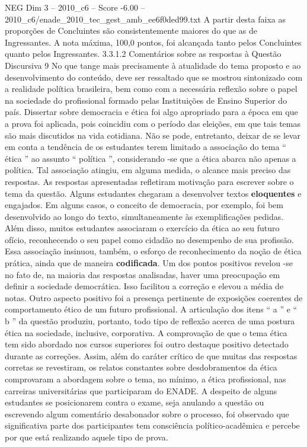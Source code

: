 \begin{textsample}{NEG Dim 3 – 2010\_c6 – Score -6.00 – 2010\_c6/enade\_2010\_tec\_gest\_amb\_ee6f0ded99.txt}
A partir desta faixa as proporções de Concluintes são consistentemente maiores do que as de Ingressantes.
A nota máxima, 100,0 pontos, foi alcançada tanto pelos Concluintes quanto pelos Ingressantes. 3.3.1.2 Comentários sobre as respostas à Questão Discursiva 9 No que tange mais precisamente à atualidade do tema proposto e ao desenvolvimento do conteúdo, deve ser ressaltado que se mostrou sintonizado com a realidade política brasileira, bem como com a necessária reflexão sobre o papel na sociedade do profissional formado pelas Instituições de Ensino Superior do país.
Dissertar sobre democracia e ética foi algo apropriado para a época em que a prova foi aplicada, pois coincidiu com o período das eleições, em que tais temas são mais discutidos na vida cotidiana.
Não se pode, entretanto, deixar de se levar em conta a tendência de os estudantes terem limitado a associação do tema “ ética ” ao assunto “ política ”, considerando -se que a ética abarca não apenas a política.
Tal associação atingiu, em alguma medida, o alcance mais preciso das respostas.
As respostas apresentadas refletiram motivação para escrever sobre o tema da questão.
Alguns estudantes chegaram a desenvolver textos \textbf{eloquentes} e engajados.
Em alguns casos, o conceito de democracia, por exemplo, foi bem desenvolvido ao longo do texto, simultaneamente às exemplificações pedidas.
Além disso, muitos estudantes associaram o exercício da ética ao seu futuro ofício, reconhecendo o seu papel como cidadão no desempenho de sua profissão.
Essa associação insinuou, também, o esforço de reconhecimento da noção de ética prática, ainda que de maneira \textbf{codificada}.
Um dos pontos positivos revelou -se no fato de, na maioria das respostas analisadas, haver uma preocupação em definir a sociedade democrática.
Isso facilitou a correção e elevou a média de notas.
Outro aspecto positivo foi a presença pertinente de exposições coerentes de comportamento ético de um futuro profissional.
A articulação dos itens “ a ” e “ b ” da questão produziu, portanto, todo tipo de reflexão acerca de uma postura ética na sociedade, inclusive, corporativa.
A comprovação de que o tema ética tem sido abordado nos cursos superiores foi outro destaque positivo detectado durante as correções.
Assim, além do caráter crítico de que muitas das respostas corretas se revestiram, os relatos constantes sobre desdobramentos da ética comprovaram a abordagem sobre o tema, no mínimo, a ética profissional, nas carreiras universitárias que participaram do ENADE.
A despeito de alguns estudantes se posicionarem contra o exame, seja anulando a questão ou escrevendo algum comentário desabonador sobre o processo, foi observado que significativa parte dos participantes tem consciência político-acadêmica e percebe por que está realizando aquele tipo de prova.

\end{textsample}

